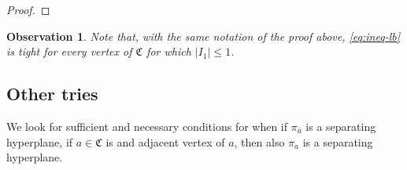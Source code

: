 \documentclass{article}
\newtheorem{observation}[theorem]{Observation}
\begin{document}
\begin{proof}
	\end{proof}
	\begin{observation}
		Note that, with the same notation of the proof above, \eqref{eq:ineq-lb} is tight for every vertex of \(\mathfrak{C}\) for which \(|I_1| \leq 1\).
	\end{observation}


\subsection{Other tries}



We look for sufficient and necessary conditions for when if \(\pi_{\bar{a}}\) is a separating hyperplane, if \(a \in \mathfrak{C}\) is and adjacent vertex of \(a\), then also \(\pi_a\) is a separating hyperplane.
\end{document}

